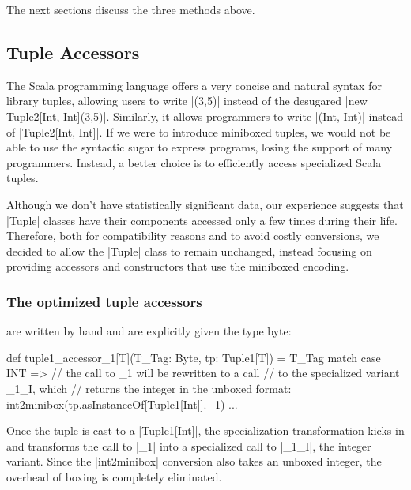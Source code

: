 The next sections discuss the three methods above.

\vspace{-0.5em}

\subsection{Tuple Accessors}
\label{sec:tuples}

\vspace{-0.25em}

The Scala programming language offers a very concise and natural syntax for library tuples, allowing users to write |(3,5)| instead of the desugared |new Tuple2[Int, Int](3,5)|. Similarly, it allows programmers to write |(Int, Int)| instead of |Tuple2[Int, Int]|. If we were to introduce miniboxed tuples, we would not be able to use the syntactic sugar to express programs, losing the support of many programmers. Instead, a better choice is to efficiently access specialized Scala tuples.

Although we don't have statistically significant data, our experience suggests that |Tuple| classes have their components accessed only a few times during their life. Therefore, both for compatibility reasons and to avoid costly conversions, we decided to allow the |Tuple| class to remain unchanged, instead focusing on providing accessors and constructors that use the miniboxed encoding.

\subsubsection{The optimized tuple accessors} are written by hand and are explicitly given the type byte:

\begin{lstlisting-nobreak}
 def tuple1_accessor_1[T](T_Tag: Byte, tp: Tuple1[T]) =
   T_Tag match {
     case INT =>
       // the call to _1 will be rewritten to a call
       // to the specialized variant _1_I, which
       // returns the integer in the unboxed format:
       int2minibox(tp.asInstanceOf[Tuple1[Int]]._1)
     ...
   }
\end{lstlisting-nobreak}

Once the tuple is cast to a |Tuple1[Int]|, the specialization transformation kicks in and transforms the call to |_1| into a specialized call to |_1_I|, the integer variant. Since the |int2minibox| conversion also takes an unboxed integer, the overhead of boxing is completely eliminated.


